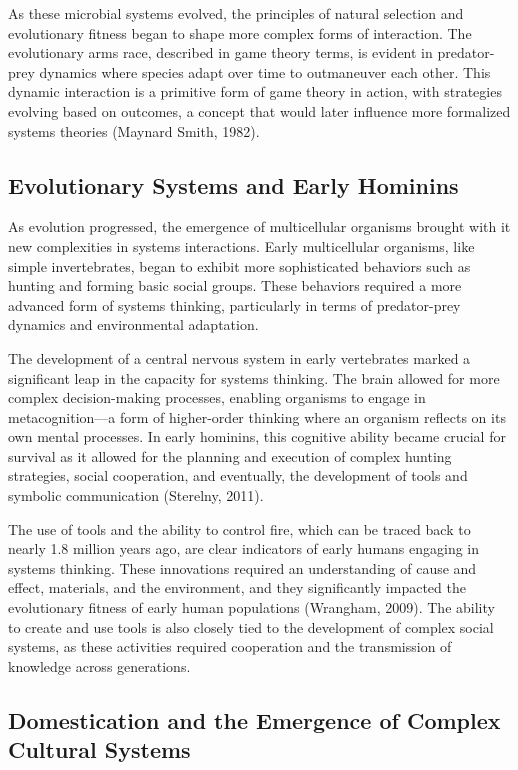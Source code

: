 \documentclass[twocolumn]{article}
\begin{document}
\textcolor{secondary}{As these microbial systems evolved, the principles of natural selection and evolutionary fitness began to shape more complex forms of interaction. The evolutionary arms race, described in game theory terms, is evident in predator-prey dynamics where species adapt over time to outmaneuver each other. This dynamic interaction is a primitive form of game theory in action, with strategies evolving based on outcomes, a concept that would later influence more formalized systems theories (Maynard Smith, 1982).}

\subsection{Evolutionary Systems and Early Hominins} 

\textcolor{primary}{As evolution progressed, the emergence of multicellular organisms brought with it new complexities in systems interactions. Early multicellular organisms, like simple invertebrates, began to exhibit more sophisticated behaviors such as hunting and forming basic social groups. These behaviors required a more advanced form of systems thinking, particularly in terms of predator-prey dynamics and environmental adaptation.}

\textcolor{secondary}{The development of a central nervous system in early vertebrates marked a significant leap in the capacity for systems thinking. The brain allowed for more complex decision-making processes, enabling organisms to engage in metacognition—a form of higher-order thinking where an organism reflects on its own mental processes. In early hominins, this cognitive ability became crucial for survival as it allowed for the planning and execution of complex hunting strategies, social cooperation, and eventually, the development of tools and symbolic communication (Sterelny, 2011).}

\textcolor{primary}{The use of tools and the ability to control fire, which can be traced back to nearly 1.8 million years ago, are clear indicators of early humans engaging in systems thinking. These innovations required an understanding of cause and effect, materials, and the environment, and they significantly impacted the evolutionary fitness of early human populations (Wrangham, 2009). The ability to create and use tools is also closely tied to the development of complex social systems, as these activities required cooperation and the transmission of knowledge across generations.}

\subsection{Domestication and the Emergence of Complex Cultural Systems}
\end{document}
